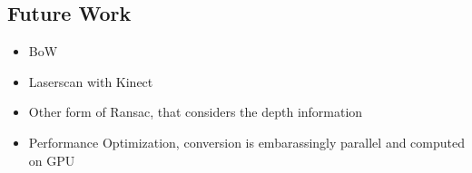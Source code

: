 \subsection{Future Work}

\begin{itemize}
    \item BoW
    \item Laserscan with Kinect
    \item Other form of Ransac, that considers the depth information
    \item Performance Optimization, conversion is embarassingly parallel and computed on GPU
\end{itemize}
